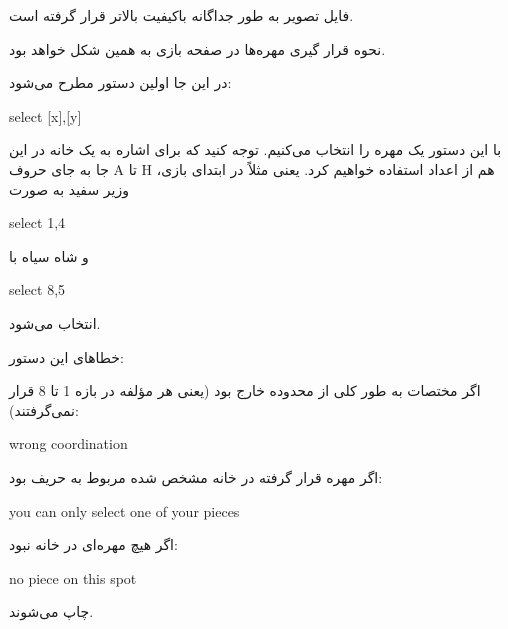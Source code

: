 \documentclass[]{article}
\begin{document}
 فایل تصویر به طور جداگانه باکیفیت بالاتر قرار گرفته است.

نحوه قرار گیری مهره‌ها در صفحه بازی به همین شکل خواهد بود.

در این جا اولین دستور مطرح می‌شود:


\begin{tcolorbox}[boxrule=0pt]
	\begin{latin}
  	  \large{
  	  	select [x],[y]
		}
	\end{latin}
\end{tcolorbox}

 با این دستور یک مهره را انتخاب می‌کنیم. توجه کنید که برای اشاره به یک خانه در این جا به جای حروف A تا H هم از اعداد استفاده خواهیم کرد. یعنی مثلاً در ابتدای بازی، وزیر سفید به صورت
\begin{latin}
  select 1,4
  \end{latin}
   و شاه سیاه با
   \begin{latin}
    select 8,5
    \end{latin}
     انتخاب می‌شود.

 خطاهای این دستور:

 اگر مختصات به طور کلی از محدوده خارج بود (یعنی هر مؤلفه در بازه 1 تا 8 قرار نمی‌گرفتند):



\begin{tcolorbox}[boxrule=0pt]
	\begin{latin}
  	  \large{
  	  	wrong coordination
		}
	\end{latin}
\end{tcolorbox}

اگر مهره قرار گرفته در خانه مشخص شده مربوط به حریف بود:



\begin{tcolorbox}[boxrule=0pt]
	\begin{latin}
  	  \large{
  	  	you can only select one of your pieces
		}
	\end{latin}
\end{tcolorbox}

اگر هیچ مهره‌ای در خانه نبود:



\begin{tcolorbox}[boxrule=0pt]
	\begin{latin}
  	  \large{
  	  	no piece on this spot
		}
	\end{latin}
\end{tcolorbox}

چاپ می‌شوند.
\end{document}
